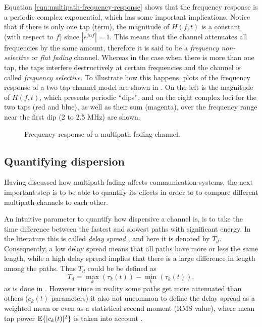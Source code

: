 Equation \eqref{eqn:multipath-frequency-response} shows that the frequency response is a periodic complex exponential, which has some important implications. Notice that if there is only one tap (term), the magnitude of \(H(f, t)\) is a constant (with respect to \(f\)) since \(|e^{j\alpha f}| = 1\). This means that the channel attenuates all frequencies by the same amount, therefore it is said to be a \emph{frequency non-selective} or \emph{flat fading} channel. Whereas in the case when there is more than one tap, the taps interfere destructively at certain frequencies and the channel is called \emph{frequency selective}. To illustrate how this happens, plots of the frequency response of a two tap channel model are shown in . On the left is the magnitude of \(H(f, t)\), which presents periodic ``dips'', and on the right complex loci for the two taps (red and blue), as well as their sum (magenta), over the frequency range near the first dip (2 to 2.5 MHz) are shown.


\begin{figure}
	\centering
	\resizebox{\linewidth}{!}{
		
	}
	\caption{
		Frequency response of a multipath fading channel.
		\label{fig:multipath-frequency-response-plots}
	}
\end{figure}

\subsection{Quantifying dispersion}

Having discussed how multipath fading affects communication systems, the next important step is to be able to quantify its effects in order to to compare different multipath channels to each other.

An intuitive parameter to quantify how dispersive a channel is, is to take the time difference between the fastest and slowest paths with significant energy. In the literature this is called \emph{delay spread} \cite{Messier}, and here it is denoted by \(T_d\). Consequently, a low delay spread means that all paths have more or less the same length, while a high delay spread implies that there is a large difference in length among the paths. Thus \(T_d\) could be be defined as
\begin{equation}
	T_d = \max_{k} (\tau_k(t)) -  \min_{k} (\tau_k(t)),
\end{equation}
as is done in \cite{Gallager}. However since in reality some paths get more attenuated than others (\(c_k(t)\) parameters) it also not uncommon to define the delay spread as a weighted mean or even as a statistical second moment (RMS value), where mean tap power \(\operatorname{E}\{|c_k(t)|^2\}\) is taken into account \cite{Mathis,Messier}. %


